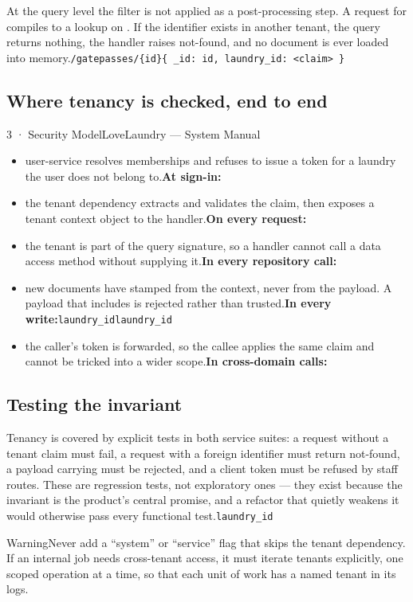 \documentclass[11pt,a4paper,oneside]{book}
\begin{document}
At the query level the filter is not applied as a post-processing step. A request for  compiles to a lookup on . If the identifier exists in another tenant, the query returns nothing, the handler raises not-found, and no document is ever loaded into memory.\texttt{/gatepasses/\{id\}}\texttt{\{ \_id: id, laundry\_id: <claim> \}}

\subsection*{Where tenancy is checked, end to end}
3 · Security ModelLoveLaundry — System Manual

\begin{itemize}
\item user-service resolves memberships and refuses to issue a token for a laundry the user does not belong to.\textbf{At sign-in:}
\item the tenant dependency extracts and validates the claim, then exposes a tenant context object to the handler.\textbf{On every request:}
\item the tenant is part of the query signature, so a handler cannot call a data access method without supplying it.\textbf{In every repository call:}
\item new documents have  stamped from the context, never from the payload. A payload that includes  is rejected rather than trusted.\textbf{In every write:}\texttt{laundry\_id}\texttt{laundry\_id}
\item the caller's token is forwarded, so the callee applies the same claim and cannot be tricked into a wider scope.\textbf{In cross-domain calls:}
\end{itemize}
\subsection*{Testing the invariant}
Tenancy is covered by explicit tests in both service suites: a request without a tenant claim must fail, a request with a foreign identifier must return not-found, a payload carrying  must be rejected, and a client token must be refused by staff routes. These are regression tests, not exploratory ones — they exist because the invariant is the product's central promise, and a refactor that quietly weakens it would otherwise pass every functional test.\texttt{laundry\_id}

\begin{notebox}WarningNever add a “system” or “service” flag that skips the tenant dependency. If an internal job needs cross-tenant access, it must iterate tenants explicitly, one scoped operation at a time, so that each unit of work has a named tenant in its logs.\end{notebox}
\end{document}
